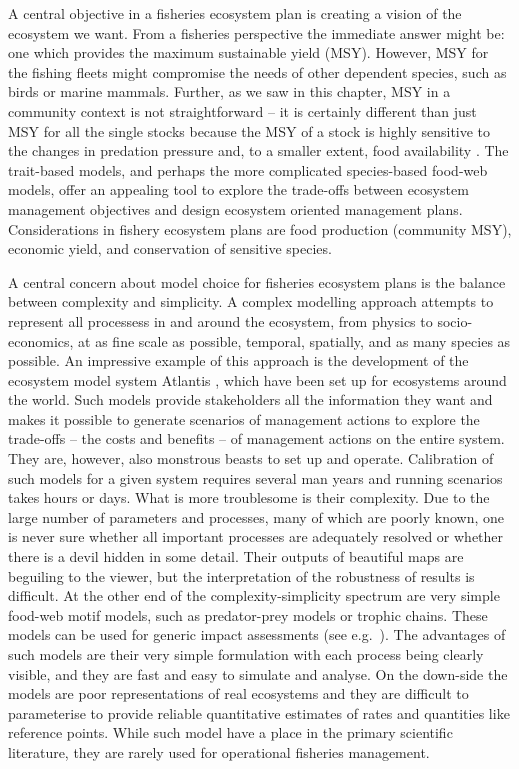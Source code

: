 A central objective in a fisheries ecosystem plan is creating a vision of the ecosystem we want.  From a fisheries perspective the immediate answer might be: one which provides the maximum sustainable yield (MSY).  However, MSY for the fishing fleets might compromise the needs of other dependent species, such as birds or marine mammals.  Further, as we saw in this chapter, MSY in a community context is not straightforward -- it is certainly different than just MSY for all the single stocks because the MSY of a stock is highly sensitive to the changes in predation pressure and, to a smaller extent, food availability \citep{Rindorf2016}.  The trait-based models, and perhaps the more complicated species-based food-web models, offer an appealing tool to explore the trade-offs between ecosystem management objectives and design ecosystem oriented management plans.  Considerations in fishery ecosystem plans are food production (community MSY), economic yield, and conservation of sensitive species. 

A central concern about model choice for fisheries ecosystem plans is the balance between complexity and simplicity.  A complex modelling approach attempts to represent all processess in and around the ecosystem, from physics to socio-economics, at as fine scale as possible, temporal, spatially, and as many species as possible.  An impressive example of this approach is the development of the ecosystem model system Atlantis \citep{Fulton2011}, which have been set up for ecosystems around the world.  Such models provide stakeholders all the information they want and makes it possible to generate scenarios of management actions to explore the trade-offs -- the costs and benefits -- of management actions on the entire system.  They are, however, also monstrous beasts to set up and operate.  Calibration of such models for a given system requires several man years and running scenarios takes hours or days.  What is more troublesome is their complexity.  Due to the large number of parameters and processes, many of which are poorly known, one is never sure whether all important processes are adequately resolved or whether there is a devil hidden in some detail.  Their outputs of beautiful maps are beguiling to the viewer, but the interpretation of the robustness of results is difficult.  At the other end of the complexity-simplicity spectrum are very simple food-web motif models, such as predator-prey models or trophic chains.  These models can be used for generic impact assessments (see e.g.~\citet{Matsuda2006}).  The advantages of such models are their very simple formulation with each process being clearly visible, and they are fast and easy to simulate and analyse.  On the down-side the models are poor representations of real ecosystems and they are difficult to parameterise to provide reliable quantitative estimates of rates and quantities like reference points.  While such model have a place in the primary scientific literature, they are rarely used for operational fisheries management.  


